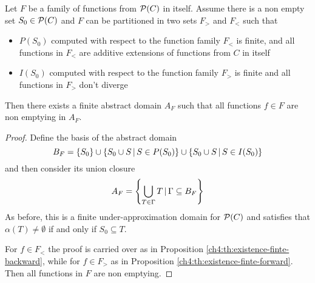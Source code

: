 \begin{theorem}\label{ch4:th:existence-finite-backward-forward}
	Let $F$ be a family of functions from $\mathcal{P}(C)$ in itself. Assume there is a non empty set $S_0 \in \mathcal{P}(C)$ and $F$ can be partitioned in two sets $F_{>}$ and $F_{<}$ such that
	\begin{itemize}
		\item $P(S_0)$ computed with respect to the function family $F_{<}$ is finite, and all functions in $F_{<}$ are additive extensions of functions from $C$ in itself
		\item $I(S_0)$ computed with respect to the function family $F_{>}$ is finite and all functions in $F_{>}$ don't diverge
	\end{itemize}
	Then there exists a finite abstract domain $A_F$ such that all functions $f \in F$ are non emptying in $A_F$.
\end{theorem}
\begin{proof}
	Define the basis of the abstract domain
	\[
	B_F = \{ S_0 \} \cup \{ S_0 \cup S \,\vert\, S \in P(S_0) \} \cup \{ S_0 \cup S \,\vert\, S \in I(S_0) \}
	\]
	and then consider its union closure
	\[
	A_F = \left\lbrace \bigcup\limits_{T \in \Gamma} T \,\vert\, \Gamma \subseteq B_F \right\rbrace
	\]
	As before, this is a finite under-approximation domain for $\mathcal{P}(C)$ and satisfies that	$\alpha(T) \neq \emptyset$ if and only if $S_0 \subseteq T$.

	For $f \in F_{<}$ the proof is carried over as in Proposition \ref{ch4:th:existence-finte-backward}, while for $f \in F_{>}$ as in Proposition \ref{ch4:th:existence-finte-forward}. Then all functions in $F$ are non emptying.
\end{proof}

